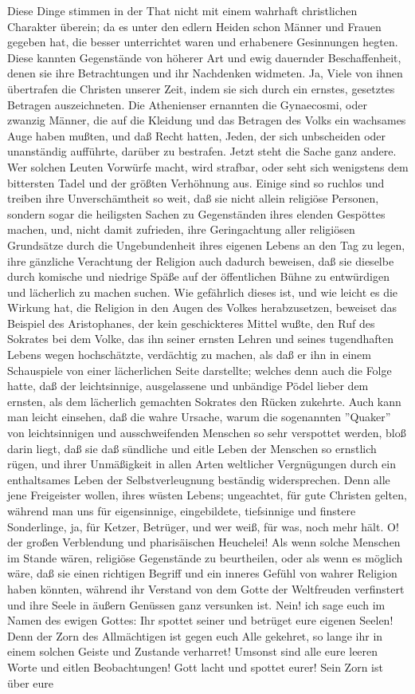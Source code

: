 Diese Dinge stimmen in der That nicht mit einem wahrhaft christlichen Charakter überein; da es unter den edlern Heiden schon Männer und Frauen gegeben hat, die besser unterrichtet waren und erhabenere Gesinnungen hegten. Diese kannten Gegenstände von höherer Art und ewig dauernder Beschaffenheit, denen sie ihre Betrachtungen und ihr Nachdenken widmeten. Ja, Viele von ihnen übertrafen die Christen unserer Zeit, indem sie sich durch ein ernstes, gesetztes Betragen auszeichneten. Die Athenienser ernannten die Gynaecosmi, oder zwanzig Männer, die auf die Kleidung und das Betragen des Volks ein wachsames Auge haben mußten, und daß Recht hatten, Jeden, der sich unbscheiden oder unanständig aufführte, darüber zu bestrafen. Jetzt steht die Sache ganz andere. Wer solchen Leuten Vorwürfe macht, wird strafbar, oder seht sich wenigstens dem bittersten Tadel und der größten Verhöhnung aus. Einige sind so ruchlos und treiben ihre Unverschämtheit so weit, daß sie nicht allein religiöse Personen, sondern sogar die heiligsten Sachen zu Gegenständen ihres elenden Gespöttes machen, und, nicht damit zufrieden, ihre Geringachtung aller religiösen Grundsätze durch die Ungebundenheit ihres eigenen Lebens an den Tag zu legen, ihre gänzliche Verachtung der Religion auch dadurch beweisen, daß sie dieselbe durch komische und niedrige Späße auf der öffentlichen Bühne zu entwürdigen und lächerlich zu machen suchen. Wie gefährlich dieses ist, und wie leicht es die Wirkung hat, die Religion in den Augen des Volkes herabzusetzen, beweiset das Beispiel des Aristophanes, der kein geschickteres Mittel wußte, den Ruf des Sokrates bei dem Volke, das ihn seiner ernsten Lehren und seines tugendhaften Lebens wegen hochschätzte, verdächtig zu machen, als daß er ihn in einem Schauspiele von einer lächerlichen Seite darstellte; welches denn auch die Folge hatte, daß der leichtsinnige, ausgelassene und unbändige Pödel lieber dem ernsten, als dem lächerlich gemachten Sokrates den Rücken zukehrte. Auch kann man leicht einsehen, daß die wahre Ursache, warum die sogenannten ''Quaker'' von leichtsinnigen und ausschweifenden Menschen so sehr verspottet werden, bloß darin liegt, daß sie daß sündliche und eitle Leben der Menschen so ernstlich rügen, und ihrer Unmäßigkeit in allen Arten weltlicher Vergnügungen durch ein enthaltsames Leben der Selbstverleugnung beständig widersprechen. Denn alle jene Freigeister wollen, ihres wüsten Lebens; ungeachtet, für gute Christen gelten, während man uns für eigensinnige, eingebildete, tiefsinnige und finstere Sonderlinge, ja, für Ketzer, Betrüger, und wer weiß, für was, noch mehr hält. O! der großen Verblendung und pharisäischen Heuchelei! Als wenn solche Menschen im Stande wären, religiöse Gegenstände zu beurtheilen, oder als wenn es möglich wäre, daß sie einen richtigen Begriff und ein inneres Gefühl von wahrer Religion haben könnten, während ihr Verstand von dem Gotte der Weltfreuden verfinstert und ihre Seele in äußern Genüssen ganz versunken ist. Nein! ich sage euch im Namen des ewigen Gottes: Ihr spottet seiner und betrüget eure eigenen Seelen! Denn der Zorn des Allmächtigen ist gegen euch Alle gekehret, so lange ihr in einem solchen Geiste und Zustande verharret! Umsonst sind alle eure leeren Worte und eitlen Beobachtungen! Gott lacht und spottet eurer! Sein Zorn ist über eure 